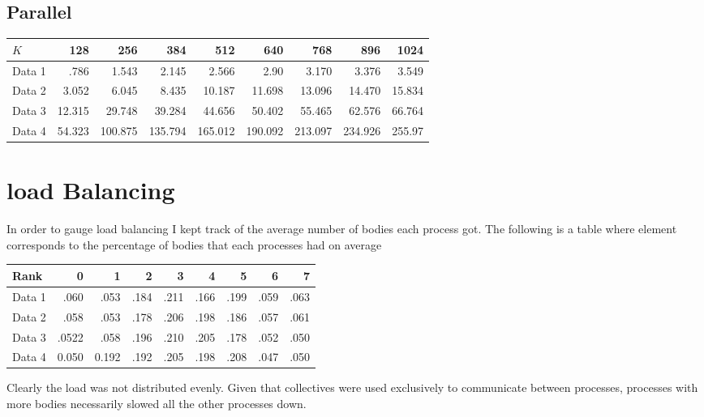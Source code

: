 \documentclass[11pt]{article}
\begin{document}
\subsection{Parallel}
\label{sec:orgfe6fb61}

\begin{center}
\begin{tabular}{lrrrrrrrr}
\(K\) & 128 & 256 & 384 & 512 & 640 & 768 & 896 & 1024\\
\hline
Data 1 & .786 & 1.543 & 2.145 & 2.566 & 2.90 & 3.170 & 3.376 & 3.549\\
Data 2 & 3.052 & 6.045 & 8.435 & 10.187 & 11.698 & 13.096 & 14.470 & 15.834\\
Data 3 & 12.315 & 29.748 & 39.284 & 44.656 & 50.402 & 55.465 & 62.576 & 66.764\\
Data 4 & 54.323 & 100.875 & 135.794 & 165.012 & 190.092 & 213.097 & 234.926 & 255.97\\
\end{tabular}
\end{center}

\section{load Balancing}
\label{sec:org519bd5b}

In order to gauge load balancing I kept track of the average number of bodies each process got. The following is a table where element corresponds to the percentage of bodies that each processes had on average

\begin{center}
\begin{tabular}{lrrrrrrrr}
Rank & 0 & 1 & 2 & 3 & 4 & 5 & 6 & 7\\
\hline
Data 1 & .060 & .053 & .184 & .211 & .166 & .199 & .059 & .063\\
Data 2 & .058 & .053 & .178 & .206 & .198 & .186 & .057 & .061\\
Data 3 & .0522 & .058 & .196 & .210 & .205 & .178 & .052 & .050\\
Data 4 & 0.050 & 0.192 & .192 & .205 & .198 & .208 & .047 & .050\\
\end{tabular}
\end{center}

Clearly the load was not distributed evenly. Given that collectives were used exclusively to communicate between processes, processes with more bodies necessarily slowed all the other processes down.
\end{document}
